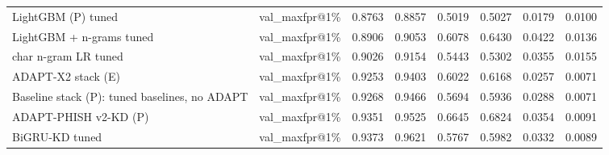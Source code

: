 \begin{table}[t]
\begin{tabular}{llrrrrrr}
LightGBM (P) tuned & val\_maxfpr@1\% & 0.8763 & 0.8857 & 0.5019 & 0.5027 & 0.0179 & 0.0100 \\
LightGBM + n-grams tuned & val\_maxfpr@1\% & 0.8906 & 0.9053 & 0.6078 & 0.6430 & 0.0422 & 0.0136 \\
char n-gram LR tuned & val\_maxfpr@1\% & 0.9026 & 0.9154 & 0.5443 & 0.5302 & 0.0355 & 0.0155 \\
ADAPT-X2 stack (E) & val\_maxfpr@1\% & 0.9253 & 0.9403 & 0.6022 & 0.6168 & 0.0257 & 0.0071 \\
Baseline stack (P): tuned baselines, no ADAPT & val\_maxfpr@1\% & 0.9268 & 0.9466 & 0.5694 & 0.5936 & 0.0288 & 0.0071 \\
ADAPT-PHISH v2-KD (P) & val\_maxfpr@1\% & 0.9351 & 0.9525 & 0.6645 & 0.6824 & 0.0354 & 0.0091 \\
BiGRU-KD tuned & val\_maxfpr@1\% & 0.9373 & 0.9621 & 0.5767 & 0.5982 & 0.0332 & 0.0089 \\
\bottomrule
\end{tabular}
\end{table}